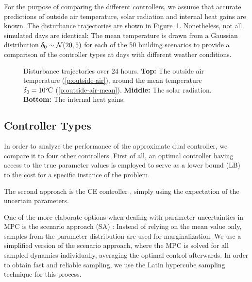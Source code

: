 For the purpose of comparing the different controllers, we assume that
accurate predictions of outside air temperature, solar radiation and internal
heat gains are known. The disturbance trajectories are shown in
Figure~\ref{fig:disturbances}. Nonetheless, not all simulated days are
identical: The mean temperature is drawn from a Gaussian distribution
$\delta_0\sim\mathcal{N}(20,5)$ for each of the 50 building scenarios to provide a
comparison of the controller types at days with different weather conditions.

\begin{figure}
  \setlength{\figurewidth}{0.9\columnwidth}
  \setlength{\figureheight}{4cm}
  \footnotesize
  \vspace{-2mm}
  \caption[Disturbance trajectories over 24 hours.]{Disturbance trajectories
over 24 hours. {\bfseries Top:} The outside air temperature
(\ref*{p:outside-air}), around the mean temperature
$\delta_0=10\text{\textdegree C}$ (\ref*{p:outside-air-mean}).
{\bfseries Middle:} The solar radiation. {\bfseries Bottom:} The internal heat
gains.}
  \label{fig:disturbances}
\end{figure}

\subsection{Controller Types}

In order to analyze the performance of the approximate dual controller, we
compare it to four other controllers. First of all, an optimal controller having
access to the true parameter values is employed to serve as a lower bound (LB)
to the cost for a specific instance of the problem.

The second approach is the CE controller \cite{Bar-Shalom.Tse:1974:Dual}, simply
using the expectation of the uncertain parameters.

One of the more elaborate options when dealing with parameter uncertainties in
MPC is the scenario approach (SA) \cite{Calafiore.Campi:2006:Scenario}: Instead
of relying on the mean value only, samples from the parameter distribution are
used for marginalization. We use a simplified version of the scenario approach,
where the MPC is solved for all sampled dynamics individually, averaging the
optimal control afterwards. In order to obtain fast and reliable sampling, we
use the Latin hypercube sampling technique
\cite{McKay.Beckman.ea:1979:Comparison} for
this process.

